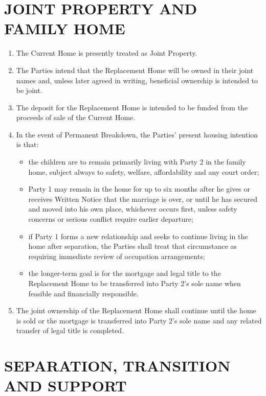 \documentclass[10pt,a4paper]{article}
\begin{document}
\section*{JOINT PROPERTY AND FAMILY HOME}

\begin{enumerate}[label=\arabic*., start=22, leftmargin=1.8em]
    \item The Current Home is presently treated as Joint Property.
    \item The Parties intend that the Replacement Home will be owned in their joint names and, unless later agreed in writing, beneficial ownership is intended to be joint.
    \item The deposit for the Replacement Home is intended to be funded from the proceeds of sale of the Current Home.
    \item In the event of Permanent Breakdown, the Parties' present housing intention is that:
    \begin{itemize}[leftmargin=1.8em]
        \item the children are to remain primarily living with Party 2 in the family home, subject always to safety, welfare, affordability and any court order;
        \item Party 1 may remain in the home for up to six months after he gives or receives Written Notice that the marriage is over, or until he has secured and moved into his own place, whichever occurs first, unless safety concerns or serious conflict require earlier departure;
        \item if Party 1 forms a new relationship and seeks to continue living in the home after separation, the Parties shall treat that circumstance as requiring immediate review of occupation arrangements;
        \item the longer-term goal is for the mortgage and legal title to the Replacement Home to be transferred into Party 2's sole name when feasible and financially responsible.
    \end{itemize}
    \item The joint ownership of the Replacement Home shall continue until the home is sold or the mortgage is transferred into Party 2's sole name and any related transfer of legal title is completed.
\end{enumerate}

\section*{SEPARATION, TRANSITION AND SUPPORT}
\end{document}
